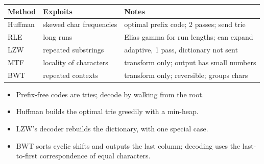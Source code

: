 \begin{center}
\begin{tabular}{lll}
\toprule
Method & Exploits & Notes\\
\midrule
Huffman & skewed char frequencies & optimal prefix code; 2 passes; send trie\\
RLE & long runs & Elias gamma for run lengths; can expand\\
LZW & repeated substrings & adaptive, 1 pass, dictionary not sent\\
MTF & locality of characters & transform only; output has small numbers\\
BWT & repeated contexts & transform only; reversible; groups chars\\
\bottomrule
\end{tabular}
\end{center}
\begin{itemize}
  \item Prefix-free codes are tries; decode by walking from the root.
  \item Huffman builds the optimal trie greedily with a min-heap.
  \item LZW's decoder rebuilds the dictionary, with one special case.
  \item BWT sorts cyclic shifts and outputs the last column; decoding uses the
        last-to-first correspondence of equal characters.
\end{itemize}

